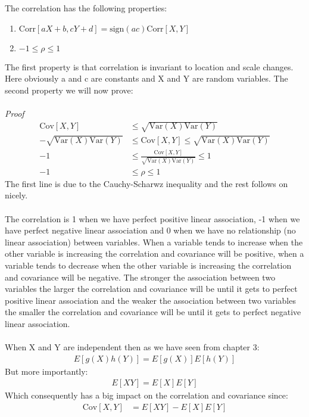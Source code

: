 \documentclass[,oneside]{article}
\begin{document}
\begin{enumerate}
The correlation has the following properties:
\begin{enumerate}
\item $\text{Corr}[aX+b,cY+d] = \text{sign}(ac)\text{Corr}[X,Y]$
\item $-1 \leq \rho \leq 1$
\end{enumerate}
The first property is that correlation is invariant to location and scale changes. Here obviously a and c are constants and X and Y are random variables. The second property we will now prove:\\ \\
\textit{Proof}
\begin{align*}
\text{Cov}[X,Y] &\leq \sqrt{\text{Var}(X)\text{Var}(Y)}\\
-\sqrt{\text{Var}(X)\text{Var}(Y)} &\leq \text{Cov}[X,Y] \leq \sqrt{\text{Var}(X)\text{Var}(Y)}\\
-1 &\leq \frac{\text{Cov}[X,Y]}{\sqrt{\text{Var}(X)\text{Var}(Y)}} \leq 1\\
-1 &\leq \rho \leq 1
\end{align*}
The first line is due to the Cauchy-Scharwz inequality and the rest follows on nicely.\\ \\
The correlation is 1 when we have perfect positive linear association, -1 when we have perfect negative linear association and 0 when we have no relationship (no linear association) between variables. When a variable tends to increase when the other variable is increasing the correlation and covariance will be positive, when a variable tends to decrease when the other variable is increasing the correlation and covariance will be negative. The stronger the association between two variables the larger the correlation and covariance will be until it gets to perfect positive linear association and the weaker the association between two variables the smaller the correlation and covariance will be until it gets to perfect negative linear association.\\ \\
When X and Y are independent then as we have seen from chapter 3:
\begin{align*}
E[g(X)h(Y)]=E[g(X)]E[h(Y)]
\end{align*}
But more importantly:
\begin{align*}
E[XY]=E[X]E[Y]
\end{align*}
Which consequently has a big impact on the correlation and covariance since:
\begin{align*}
\text{Cov}[X,Y]&=E[XY]-E[X]E[Y]\\

\end{align*}
\end{enumerate}
\end{document}
